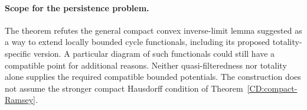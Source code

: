 \paragraph{Scope for the persistence problem.}
The theorem refutes the general compact convex inverse-limit lemma
suggested as a way to extend locally bounded cycle functionals,
including its proposed totality-specific version.
A particular diagram of such functionals could still have a compatible
point for additional reasons. Neither quasi-filteredness nor totality
alone supplies the required compatible bounded potentials. The
construction does not assume the
stronger compact Hausdorff condition of
Theorem~\ref{CD:compact-Ramsey}.

